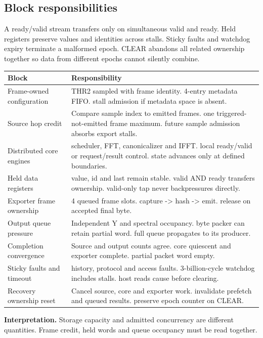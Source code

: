 \documentclass[11pt,letterpaper]{article}
\begin{document}
\subsection*{Block responsibilities}
A ready/valid stream transfers only on simultaneous valid and ready. Held registers preserve values and identities across stalls. Sticky faults and watchdog expiry terminate a malformed epoch. CLEAR abandons all related ownership together so data from different epochs cannot silently combine.
\par\medskip\noindent
\begin{tabularx}{\linewidth}{@{}>{\raggedright\arraybackslash}p{1.65in}Y@{}}\toprule
\textbf{Block} & \textbf{Responsibility} \\ \midrule
Frame-owned configuration & THR2 sampled with frame identity. 4-entry metadata FIFO. stall admission if metadata space is absent. \\[5pt]
Source hop credit & Compare sample index to emitted frames. one triggered-not-emitted frame maximum. future sample admission absorbs export stalls. \\[5pt]
Distributed core engines & scheduler, FFT, canonicalizer and IFFT. local ready/valid or request/result control. state advances only at defined boundaries. \\[5pt]
Held data registers & value, id and last remain stable. valid AND ready transfers ownership. valid-only tap never backpressures directly. \\[5pt]
Exporter frame ownership & 4 queued frame slots. capture -> hash -> emit. release on accepted final byte. \\[5pt]
Output queue pressure & Independent Y and spectral occupancy. byte packer can retain partial word. full queue propagates to its producer. \\[5pt]
Completion convergence & Source and output counts agree. core quiescent and exporter complete. partial packet word empty. \\[5pt]
Sticky faults and timeout & history, protocol and access faults. 3-billion-cycle watchdog includes stalls. host reads cause before clearing. \\[5pt]
Recovery ownership reset & Cancel source, core and exporter work. invalidate prefetch and queued results. preserve epoch counter on CLEAR. \\[5pt]
\bottomrule\end{tabularx}
\vspace{8pt}
\noindent\textbf{Interpretation.} Storage capacity and admitted concurrency are different quantities. Frame credit, held words and queue occupancy must be read together.
\clearpage
\end{document}
